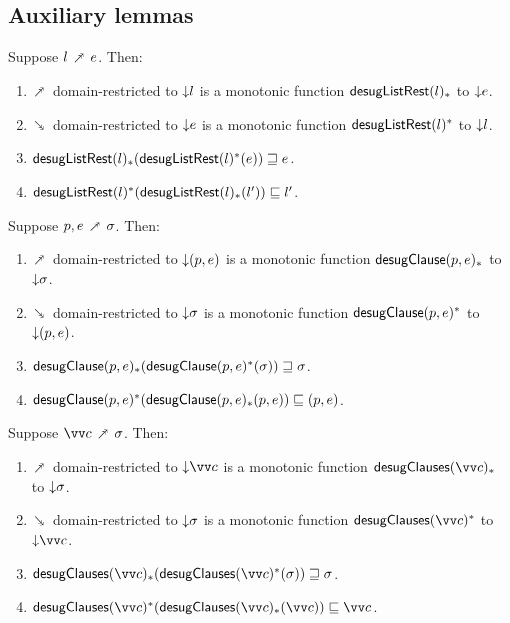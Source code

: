 \subsection{Auxiliary lemmas}

\begin{lemma}
  \label{lem:aux:desugarlistrest:gc}
  Suppose $l \dfwdarrow e$. Then:
  \begin{enumerate}
     \item $\dfwdarrow$ domain-restricted to ${\downarrow}{l}$ is a monotonic function $\mathsf{desugListRest}(l)_*$ to ${\downarrow}{e}$.
     \item $\dbwdarrow$ domain-restricted to ${\downarrow}{e}$ is a monotonic function $\mathsf{desugListRest}(l)^*$ to ${\downarrow}{l}$.
     \item $\mathsf{desugListRest}(l)_*(\mathsf{desugListRest}(l)^*(e)) \sqsupseteq e$.
     \item $\mathsf{desugListRest}(l)^*(\mathsf{desugListRest}(l)_*(l')) \sqsubseteq l'$.
  \end{enumerate}
\end{lemma}
\begin{lemma}
  \label{lem:aux:clause:gc}
  Suppose $p, e \dfwdarrow \sigma$. Then:
  \begin{enumerate}
     \item $\dfwdarrow$ domain-restricted to ${\downarrow}{(p, e)}$ is a monotonic function $\mathsf{desugClause}(p, e)_*$ to ${\downarrow}{\sigma}$.
     \item $\dbwdarrow$ domain-restricted to ${\downarrow}{\sigma}$ is a monotonic function $\mathsf{desugClause}(p, e)^*$ to ${\downarrow}{(p, e)}$.
     \item $\mathsf{desugClause}(p, e)_*(\mathsf{desugClause}(p, e)^*(\sigma)) \sqsupseteq \sigma$.
     \item $\mathsf{desugClause}(p, e)^*(\mathsf{desugClause}(p, e)_*(p, e)) \sqsubseteq (p, e)$.
  \end{enumerate}
\end{lemma}
\begin{lemma}
  \label{lem:aux:clauses:gc}
  Suppose $\vec{c} \dfwdarrow \sigma$. Then:
  \begin{enumerate}
     \item $\dfwdarrow$ domain-restricted to $\Below{\vec{c}}$ is a monotonic function $\desugarClausesFwdF{\vec{c}}$ to ${\downarrow}{\sigma}$.
     \item $\dbwdarrow$ domain-restricted to ${\downarrow}{\sigma}$ is a monotonic function $\desugarClausesBwdF{\vec{c}}$ to $\Below{\vec{c}}$.
     \item $\desugarClausesFwdF{\vec{c}}(\desugarClausesBwdF{\vec{c}}(\sigma)) \geq \sigma$.
     \item $\desugarClausesBwdF{\vec{c}}(\desugarClausesFwdF{\vec{c}}(\vec{c})) \leq \vec{c}$.
  \end{enumerate}
\end{lemma}
